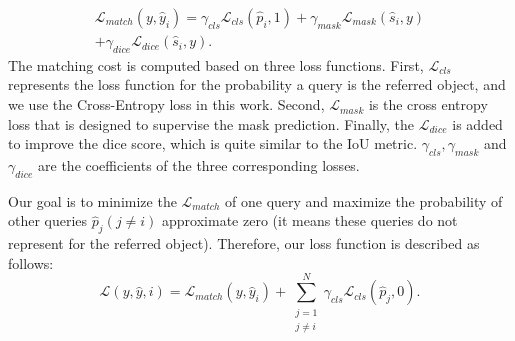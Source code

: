 \begin{equation}
\begin{split}
    \mathcal{L}_{match}(y, \hat{y}_i) = \gamma_{cls}\mathcal{L}_{cls}(\hat{p}_i, 1) + \gamma_{mask}\mathcal{L}_{mask}(\hat{s}_i, y) \\ + \gamma_{dice}\mathcal{L}_{dice}(\hat{s}_i, y).
\end{split}
\end{equation}
The matching cost is computed based on three loss functions. First, $\mathcal{L}_{cls}$ represents the loss function for the probability a query is the referred object, and we use the Cross-Entropy loss in this work. Second, $\mathcal{L}_{mask}$ is the cross entropy loss that is designed to supervise the mask prediction. Finally, the $\mathcal{L}_{dice}$ is added to improve the dice score, which is quite similar to the IoU metric. 
$\gamma_{cls}, \gamma_{mask}$ and $\gamma_{dice}$ are the coefficients of the three corresponding losses. 

Our goal is to minimize the $\mathcal{L}_{match}$ of one query and maximize the probability of other queries $\hat{p}_j (j \not= i) $ approximate zero (it means these queries do not represent for the referred object). Therefore, our loss function is described as follows: 
\begin{equation}
    \mathcal{L}(y, \hat{y}, i) = \mathcal{L}_{match}(y, \hat{y}_i) + \sum_{\substack{j = 1 \\ j \not=i}}^{N}{\gamma_{cls}\mathcal{L}_{cls}(\hat{p}_j, 0).}
\end{equation}



